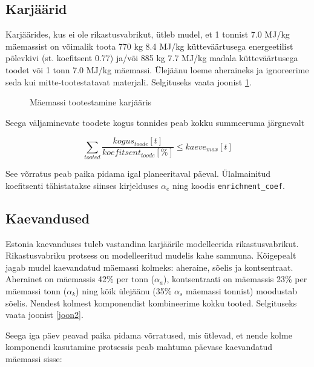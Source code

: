 \documentclass[10pt,a4paper]{article}
\begin{document}
\subsection{Karjäärid}
Karjäärides, kus ei ole rikastusvabrikut, ütleb mudel, et 1 tonnist 7.0 MJ/kg mäemassist on võimalik toota 770 kg 8.4 MJ/kg kütteväärtusega energeetilist põlevkivi (st. koefitsent 0.77) ja/või 885 kg 7.7 MJ/kg madala kütteväärtusega toodet või 1 tonn 7.0 MJ/kg mäemassi. Ülejäänu loeme aheraineks ja ignoreerime seda kui mitte-tootestatavat materjali. Selgituseks vaata joonist \ref{joon1}.

\begin{figure}

\caption{Mäemassi tootestamine karjääris
\label{joon1}}
\end{figure}

Seega väljaminevate toodete kogus tonnides peab kokku summeeruma järgne\-valt

\begin{equation}
\sum_{tooted} \frac{kogus_{toode} [t]}{koefitsent_{toode} [\%]} \le kaeve_{max} [t]
\end{equation}

See võrratus peab paika pidama igal planeeritaval päeval. Ülalmainitud koefitsenti tähistatakse siinses kirjelduses $\mathit{\alpha}_e$ ning koodis \texttt{enrichment\_coef}.

\subsection{Kaevandused}
Estonia kaevanduses tuleb vastandina karjäärile modelleerida rikastusvabrikut. Rikastusvabriku protsess on modelleeritud mudelis kahe sammuna. Kõigepealt jagab mudel kaevandatud mäemassi kolmeks: aheraine, sõelis ja kontsentraat. Aherainet on mäemassis 42\% per tonn ($\mathit{\alpha_a}$), kontsentraati on mäemassis 23\% per mäemassi tonn ($\mathit{\alpha_k}$) ning kõik ülejäänu (35\% $\mathit{\alpha_s}$ mäemassi tonnist) moodustab sõelis. Nendest kolmest komponendist kombineerime kokku tooted. Selgituseks vaata joonist \ref{joon2}.

Seega iga päev peavad paika pidama võrratused, mis ütlevad, et nende kolme komponendi kasutamine protsessis peab mahtuma päevase kaevandatud mäemassi sisse:
\end{document}
